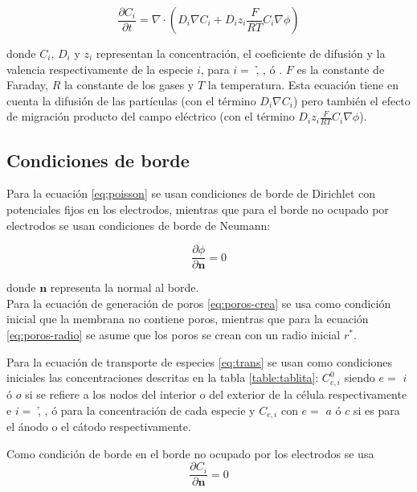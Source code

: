 
\begin{equation} \label{eq:trans}
	\frac{\partial C_i}{\partial t} = \nabla \cdot \left( D_i \nabla C_i + D_i z_i \frac{F}{R T} C_i \nabla \phi \right)
\end{equation}

donde $C_i$, $D_i$ y $z_i$ representan la concentración, el coeficiente de difusión y la valencia respectivamente de la especie $i$, para $i = $ \h, \oh, \na ó \cl.
$F$ es la constante de Faraday, $R$ la constante de los gases y $T$ la temperatura. 
Esta ecuación tiene en cuenta la difusión de las partículas (con el término $D_i \nabla C_i$) pero también el efecto de migración producto del campo eléctrico (con el término $D_i z_i \frac{F}{R T} C_i \nabla \phi$). 

\subsection*{Condiciones de borde}
Para la ecuación \ref{eq:poisson} se usan condiciones de borde de Dirichlet con potenciales fijos en los electrodos, mientras que para el borde no ocupado por electrodos se usan condiciones de borde de Neumann:

\begin{equation}
	\frac{\partial \phi}{\partial \mathbf{n}} = 0
\end{equation}

donde $\mathbf{n}$ representa la normal al borde.\\

Para la ecuación de generación de poros \ref{eq:poros-crea} se usa como condición inicial que la membrana no contiene poros, mientras que para la ecuación \ref{eq:poros-radio} se asume que los poros se crean con un radio inicial $r^*$.

Para la ecuación de transporte de especies \ref{eq:trans} se usan como condiciones iniciales las concentraciones descritas en la tabla \ref{table:tablita}: $C_{e, i}^0$ siendo $e =$ $i$ ó $o$ si se refiere a los nodos del interior o del exterior de la célula respectivamente e $i =$ \h, \oh, \na ó \cl para la concentración de cada especie y $C_{e,i}$ con $e =$ $a$ ó $c$ si es para el ánodo o el cátodo respectivamente.

Como condición de borde en el borde no ocupado por los electrodos se usa
\begin{equation}
	\frac{\partial C_i}{\partial \mathbf{n}} = 0
\end{equation}


